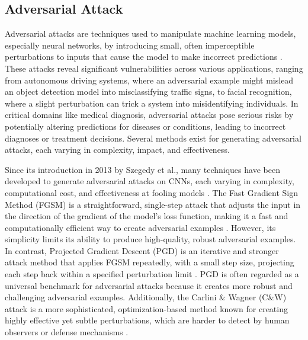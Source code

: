 \documentclass[journal,onecolumn,12pt]{IEEEtran}
\begin{document}
\subsection{Adversarial Attack}
Adversarial attacks are techniques used to manipulate machine learning models, especially neural networks, by introducing small, often imperceptible perturbations to inputs that cause the model to make incorrect predictions \cite{Li_2022}. These attacks reveal significant vulnerabilities across various applications, ranging from autonomous driving systems, where an adversarial example might mislead an object detection model into misclassifying traffic signs, to facial recognition, where a slight perturbation can trick a system into misidentifying individuals. In critical domains like medical diagnosis, adversarial attacks pose serious risks by potentially altering predictions for diseases or conditions, leading to incorrect diagnoses or treatment decisions. Several methods exist for generating adversarial attacks, each varying in complexity, impact, and effectiveness. 

Since its introduction in 2013 by Szegedy et al., many techniques have been developed to generate adversarial attacks on CNNs, each varying in complexity, computational cost, and effectiveness at fooling models \cite{szegedy2014intriguingpropertiesneuralnetworks}. The Fast Gradient Sign Method (FGSM) is a straightforward, single-step attack that adjusts the input in the direction of the gradient of the model's loss function, making it a fast and computationally efficient way to create adversarial examples \cite{goodfellow2015explainingharnessingadversarialexamples}. However, its simplicity limits its ability to produce high-quality, robust adversarial examples. In contrast, Projected Gradient Descent (PGD) is an iterative and stronger attack method that applies FGSM repeatedly, with a small step size, projecting each step back within a specified perturbation limit \cite{madry2019deeplearningmodelsresistant}. PGD is often regarded as a universal benchmark for adversarial attacks because it creates more robust and challenging adversarial examples. Additionally, the Carlini \& Wagner (C\&W) attack is a more sophisticated, optimization-based method known for creating highly effective yet subtle perturbations, which are harder to detect by human observers or defense mechanisms \cite{carlini2017evaluatingrobustnessneuralnetworks}. 
\end{document}
